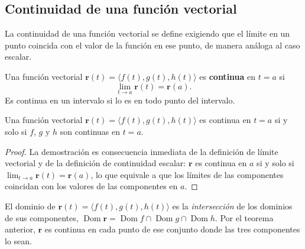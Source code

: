 \subsection{Continuidad de una función vectorial}

La continuidad de una función vectorial se define exigiendo que el
límite en un punto coincida con el valor de la función en ese punto, de
manera análoga al caso escalar.

\begin{definition}
Una función vectorial $\mathbf{r}(t) = \langle f(t), g(t), h(t) \rangle$
es \textbf{continua} en $t = a$ si
\[
\lim_{t \to a} \mathbf{r}(t) = \mathbf{r}(a).
\]
Es continua en un intervalo si lo es en todo punto del intervalo.
\end{definition}

\begin{theorem}
Una función vectorial $\mathbf{r}(t) = \langle f(t), g(t), h(t) \rangle$
es continua en $t = a$ si y solo si $f$, $g$ y $h$ son continuas en
$t = a$.
\end{theorem}
\begin{proof}
La demostración es consecuencia inmediata de la definición de límite
vectorial y de la definición de continuidad escalar: $\mathbf{r}$ es
continua en $a$ si y solo si $\lim_{t\to a}\mathbf{r}(t)=\mathbf{r}(a)$,
lo que equivale a que los límites de las componentes coincidan con los
valores de las componentes en $a$.
\end{proof}

\begin{rem}
El dominio de $\mathbf{r}(t)=\langle f(t),g(t),h(t)\rangle$ es la
\emph{intersección} de los dominios de sus componentes,
$\operatorname{Dom}\mathbf{r}=\operatorname{Dom}f\cap\operatorname{Dom}g
\cap\operatorname{Dom}h$. Por el teorema anterior, $\mathbf{r}$ es continua
en cada punto de ese conjunto donde las tres componentes lo sean.
\end{rem}

